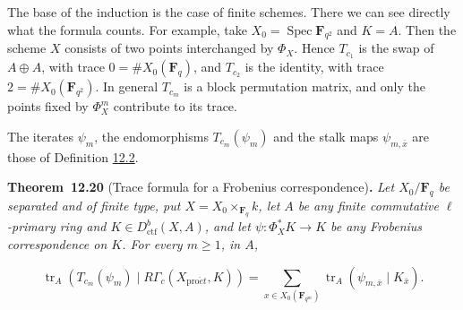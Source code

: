 \documentclass[11pt]{article}
\newenvironment{bpstatement}[2]{\par\addvspace{0.6\baselineskip}\noindent\textbf{#1}#2\textbf{.}\enspace\ignorespaces}
  {\par\addvspace{0.4\baselineskip}}
\newenvironment{bpstatementit}[2]{\begin{bpstatement}{#1}{#2}\itshape\ignorespaces}{\end{bpstatement}}
\begin{document}
The base of the induction is the case of finite schemes. There we can see directly what the formula counts. For example, take \(X_0=\operatorname{Spec}\mathbf F_{q^2}\) and \(K=A\). Then the scheme \(X\) consists of two points interchanged by \(\Phi_X\). Hence \(T_{c_1}\) is the swap of \(A\oplus A\), with trace \(0=\#X_0(\mathbf F_q)\), and \(T_{c_2}\) is the identity, with trace \(2=\#X_0(\mathbf F_{q^2})\). In general \(T_{c_m}\) is a block permutation matrix, and only the points fixed by \(\Phi_X^m\) contribute to its trace.

The iterates \(\psi_m\), the endomorphisms \(T_{c_m}(\psi_m)\) and the stalk maps \(\psi_{m,\bar x}\) are those of Definition \hyperref[bp232]{12.2}.

\label{bp287}%
\begin{bpstatementit}{Theorem~12.20}{ (Trace formula for a Frobenius correspondence)}
Let \(X_0/\mathbf F_q\) be separated and of finite type, put \(X=X_0\times_{\mathbf F_q}k\), let \(A\) be any finite commutative \(\ell\)-primary ring and \(K\in D^b_{\mathrm{ctf}}(X,A)\), and let \(\psi:\Phi_X^*K\to K\) be any Frobenius correspondence on \(K\). For every \(m\geq1\), in \(A\),

\[
\operatorname{tr}_A(T_{c_m}(\psi_m)\mid R\Gamma_c(X_{\mathrm{pro}\acute{e}t},K))
=\sum_{x\in X_0(\mathbf F_{q^m})}
\operatorname{tr}_A(\psi_{m,\bar x}\mid K_{\bar x}).
\]
\end{bpstatementit}
\end{document}
